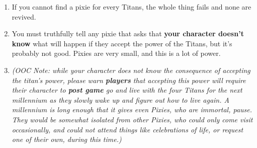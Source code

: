 \documentclass[green]{PP}
\begin{document}
\begin{enumerate}
	\begin{enumerate}
		\item If you cannot find a pixie for every Titans, the whole thing fails and none are revived.
		\item You must truthfully tell any pixie that asks that \textbf{your character doesn’t know }what will happen if they accept the power of the Titans, but it’s probably not good. Pixies are very small, and this is a lot of power.
		\item \textit{(OOC Note: while your character does not know the consequence of accepting the titan’s power, please warn \textbf{players} that accepting this power will require their character to \textbf{post game} go and live with the four Titans for the next millennium as they slowly wake up and figure out how to live again. A millennium is long enough that it gives even Pixies, who are immortal, pause. They would be somewhat isolated from other Pixies, who could only come visit occasionally, and could not attend things like celebrations of life, or request one of their own, during this time.) }
	\end{enumerate}
\end{enumerate}
\end{document}

